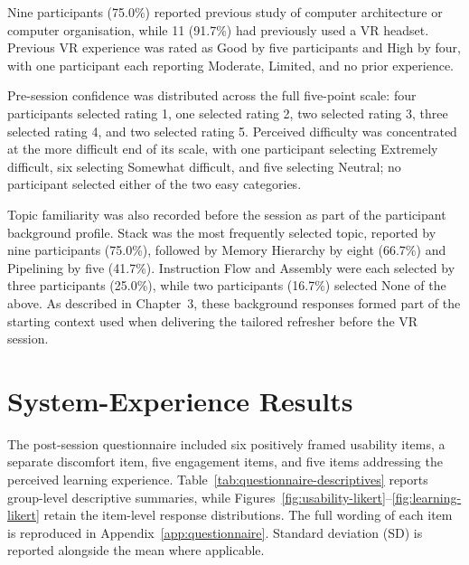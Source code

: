 Nine participants (75.0\%) reported previous study of computer architecture or computer organisation, while 11 (91.7\%) had previously used a VR headset. Previous VR experience was rated as Good by five participants and High by four, with one participant each reporting Moderate, Limited, and no prior experience.

Pre-session confidence was distributed across the full five-point scale: four participants selected rating 1, one selected rating 2, two selected rating 3, three selected rating 4, and two selected rating 5. Perceived difficulty was concentrated at the more difficult end of its scale, with one participant selecting Extremely difficult, six selecting Somewhat difficult, and five selecting Neutral; no participant selected either of the two easy categories.

Topic familiarity was also recorded before the session as part of the participant background profile. Stack was the most frequently selected topic, reported by nine participants (75.0\%), followed by Memory Hierarchy by eight (66.7\%) and Pipelining by five (41.7\%). Instruction Flow and Assembly were each selected by three participants (25.0\%), while two participants (16.7\%) selected None of the above. As described in Chapter~3, these background responses formed part of the starting context used when delivering the tailored refresher before the VR session.

\section{System-Experience Results}

The post-session questionnaire included six positively framed usability items, a separate discomfort item, five engagement items, and five items addressing the perceived learning experience. Table~\ref{tab:questionnaire-descriptives} reports group-level descriptive summaries, while Figures~\ref{fig:usability-likert}--\ref{fig:learning-likert} retain the item-level response distributions. The full wording of each item is reproduced in Appendix~\ref{app:questionnaire}. Standard deviation (SD) is reported alongside the mean where applicable.

